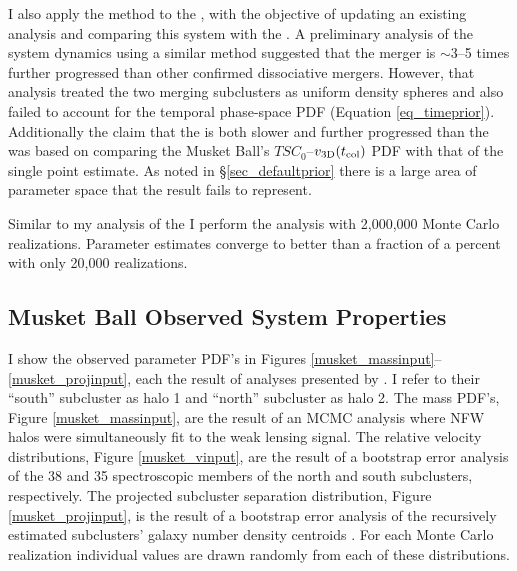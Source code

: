 \documentclass[12pt]{emulateapj}
\begin{document}
I also apply the method to the , with the objective of updating an existing analysis and comparing this system with the .  
A preliminary analysis of the system dynamics using a similar method \citep{Dawson:2012dl} suggested that the  merger is $\sim$3--5 times further progressed than other confirmed dissociative mergers.
However, that analysis treated the two merging subclusters as uniform density spheres   and also failed to account for the temporal phase-space PDF (Equation \ref{eq_timeprior}).
Additionally the claim that the  is both slower and further progressed than the  was based on comparing the Musket Ball's $TSC_0$--$v_{\rm 3D}(t_{\rm col})$ PDF with that of the single point \citet{Springel:2007bg} estimate.
As noted in \S\ref{sec_defaultprior} there is a large area of parameter space that the \citet{Springel:2007bg} result fails to represent.

Similar to my analysis of the  I perform the analysis with 2,000,000 Monte Carlo realizations.
Parameter estimates converge to better than a fraction of a percent with only 20,000 realizations.

\subsection{Musket Ball Observed System Properties}

I show the observed  parameter PDF's in Figures \ref{musket_massinput}--\ref{musket_projinput}, each the result of analyses presented by \citet{Dawson:2012dl}.  
I refer to their ``south'' subcluster as halo 1 and ``north'' subcluster as halo 2. 
The mass PDF's, Figure \ref{musket_massinput}, are the result of an MCMC analysis where NFW halos were simultaneously fit to the weak lensing signal.
The relative velocity distributions, Figure \ref{musket_vinput}, are the result of a bootstrap error analysis \citep{Beers:1990kg} of the 38 and 35 spectroscopic members of the north and south subclusters, respectively.
The projected subcluster separation distribution, Figure \ref{musket_projinput}, is the result of a bootstrap error analysis of the recursively estimated subclusters' galaxy number density centroids \citep[see e.g.][for a description of this method]{Randall:2008hs}.
For each Monte Carlo realization individual values are drawn randomly from each of these distributions. 
\end{document}
